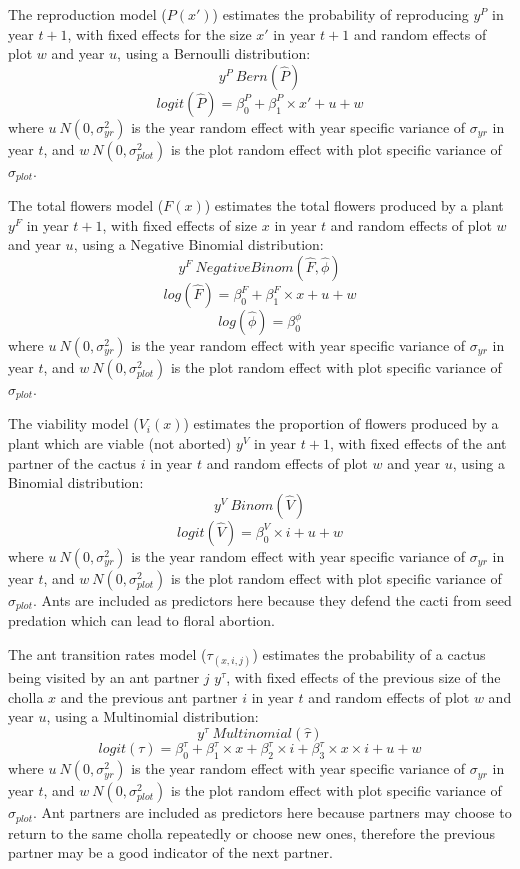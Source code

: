 \documentclass[11pt]{article}
\begin{document}
The reproduction model ($P(x')$) estimates the probability of reproducing $y^P$ in year $t+1$, with fixed effects for the size $x'$ in year $t+1$ and random effects of plot $w$ and year $u$, using a Bernoulli distribution:
$$y^P ~ Bern(\hat{P})$$
$$logit(\hat{P}) = \beta_{0}^{P} + \beta_{1}^{P} \times x' + u + w$$
where $u ~ N(0,\sigma_{yr}^{2})$ is the year random effect with year specific variance of $\sigma_{yr}$ in year $t$, and $w ~ N(0,\sigma_{plot}^{2})$ is the plot random effect with plot specific variance of $\sigma_{plot}$.

The total flowers model ($F(x)$) estimates the total flowers produced by a plant $y^F$ in year $t+1$, with fixed effects of size $x$ in year $t$ and random effects of plot $w$ and year $u$, using a Negative Binomial distribution:
$$y^{F} ~ Negative Binom(\hat{F},\hat{\phi})$$
$$log(\hat{F}) = \beta_{0}^{F} + \beta_{1}^{F} \times x + u + w$$
$$log(\hat{\phi}) = \beta_{0}^{\phi}$$
where $u ~ N(0,\sigma_{yr}^{2})$ is the year random effect with year specific variance of $\sigma_{yr}$ in year $t$, and $w ~ N(0,\sigma_{plot}^{2})$ is the plot random effect with plot specific variance of $\sigma_{plot}$.

The viability model ($V_i(x)$) estimates the proportion of flowers produced by a plant which are viable (not aborted) $y^V$ in year $t+1$, with fixed effects of the ant partner of the cactus $i$ in year $t$ and random effects of plot $w$ and year $u$, using a Binomial distribution:
$$y^{V} ~ Binom(\hat{V})$$
$$logit(\hat{V}) = \beta_{0}^{V} \times i + u + w$$
where $u ~ N(0,\sigma_{yr}^{2})$ is the year random effect with year specific variance of $\sigma_{yr}$ in year $t$, and $w ~ N(0,\sigma_{plot}^{2})$ is the plot random effect with plot specific variance of $\sigma_{plot}$.
Ants are included as predictors here because they defend the cacti from seed predation which can lead to floral abortion. 

The ant transition rates model ($\tau_(x,i,j)$) estimates the probability of a cactus being visited by an ant partner $j$ $y^{\tau}$, with fixed effects of the previous size of the cholla $x$  and the previous ant partner $i$  in year $t$ and random effects of plot $w$ and year $u$, using a Multinomial distribution: 
$$y^{\tau} ~ Multinomial(\hat{\tau})$$
$$logit(\tau) = \beta_{0}^{\tau} + \beta_{1}^{\tau} \times x + \beta_{2}^{\tau} \times i + \beta_{3}^{\tau} \times x \times i + u + w$$
where $u ~ N(0,\sigma_{yr}^{2})$ is the year random effect with year specific variance of $\sigma_{yr}$ in year $t$, and $w ~ N(0,\sigma_{plot}^{2})$ is the plot random effect with plot specific variance of $\sigma_{plot}$.
Ant partners are included as predictors here because partners may choose to return to the same cholla repeatedly or choose new ones, therefore the previous partner may be a good indicator of the next partner. 
\end{document}
